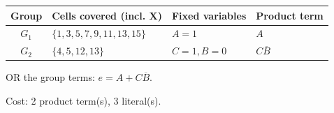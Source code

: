 \documentclass[a4paper,11pt]{article}
\begin{document}
\begin{minipage}{\textwidth}
\begin{center}\small
\begin{tabular}{clll}
\toprule
Group & Cells covered (incl. X) & Fixed variables & Product term\\\midrule
\textcolor{blue!75!black}{$G_{1}$} & $\{1,3,5,7,9,11,13,15\}$ & $A=1$ & $A$\\
\textcolor{red!75!black}{$G_{2}$} & $\{4,5,12,13\}$ & $C=1,B=0$ & $C\overline{B}$\\
\bottomrule\end{tabular}\end{center}


\noindent OR the group terms: $\boxed{e=A + C\overline{B}}$.

\noindent Cost: 2 product term(s), 3 literal(s).

\end{minipage}\par\vspace{0.25cm}
\end{document}
